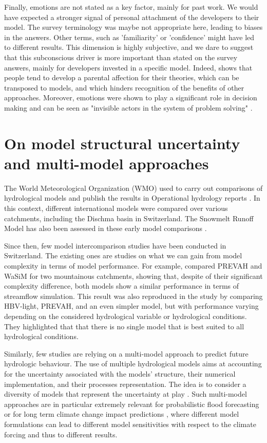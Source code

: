 \documentclass[10pt,a4paper]{article}
\begin{document}
Finally, emotions are not stated as a key factor, mainly for past work. We would have expected a stronger signal of personal attachment of the developers to their model. The survey terminology was maybe not appropriate here, leading to biases in the answers. Other terms, such as 'familiarity' or 'confidence' might have led to different results. This dimension is highly subjective, and we dare to suggest that this subconscious driver is more important than stated on the survey answers, mainly for developers invested in a specific model. Indeed, \citet{Chamberlin1890} shows that people tend to develop a parental affection for their theories, which can be transposed to models, and which hinders recognition of the benefits of other approaches. Moreover, emotions were shown to play a significant role in decision making and can be seen as "invisible actors in the system of problem solving" \citep{Hamalainen2015}.


\section{On model structural uncertainty and multi-model approaches}
\label{sec:multi-model}

The World Meteorological Organization (WMO) used to carry out comparisons of hydrological models and publish the results in Operational hydrology reports \citep{WMO1986, WMO1992a}. In this context, different international models were compared over various catchments, including the Dischma basin in Switzerland. The Snowmelt Runoff Model \citep[SRM,][see supplementary material]{Martinec1975} has also been assessed in these early model comparisons \citep{WMO1986, WMO1992a}.

Since then, few model intercomparison studies have been conducted in Switzerland. The existing ones are studies on what we can gain from model complexity in terms of model performance. For example, \citet{Gurtz2003} compared PREVAH and WaSiM for two mountainous catchments, showing that, despite of their significant complexity difference, both models show a similar performance in terms of streamflow simulation. This result was also reproduced in the study by \citet{Orth2015} comparing HBV-light, PREVAH, and an even simpler model, but with performance varying depending on the considered hydrological variable or hydrological conditions. They highlighted that that there is no single model that is best suited to all hydrological conditions.

Similarly, few studies are relying on a multi-model approach to predict future hydrologic behaviour. The use of multiple hydrological models aims at accounting for the uncertainty associated with the models' structure, their numerical implementation, and their processes representation. The idea is to consider a diversity of models that represent the uncertainty at play \citep{Babel2019}. Such multi-model approaches are in particular extremely relevant for probabilistic flood forecasting \citep{Kauffeldt2016} or for long term climate change impact predictions \citep{Kobierska2011, Kobierska2013, Andrianaki2019}, where different model formulations can lead to different model sensitivities with respect to the climate forcing and thus to different results. 
\end{document}
